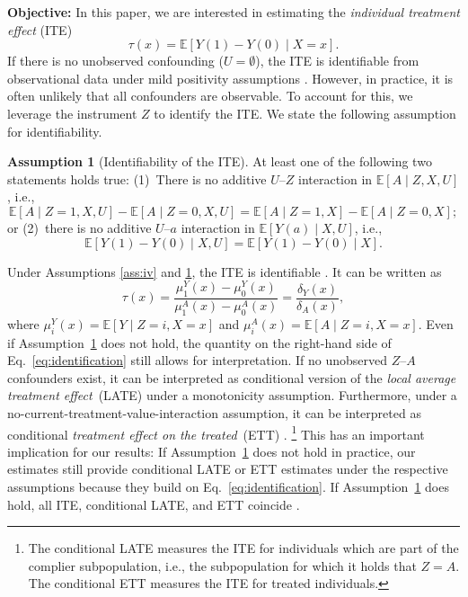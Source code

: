 \documentclass[nonatbib]{article}
\newcommand{\E}{\mathbb{E}}
\theoremstyle{definition}
\newtheorem{assumption}{Assumption}
\theoremstyle{plain}
\begin{document}
\textbf{Objective:} 
In this paper, we are interested in estimating the \emph{individual treatment effect} (ITE)
\begin{equation}
  \tau(x) = \E[Y(1) - Y(0) \mid X = x].
\end{equation}
If there is no unobserved confounding ($U = \emptyset$), the ITE is identifiable from observational data under mild positivity assumptions \cite{Shalit.2017}. However, in practice, it is often unlikely that all confounders are observable. To account for this, we leverage the instrument $Z$ to identify the ITE. We state the following assumption for identifiability.

\begin{assumption}[Identifiability of the ITE]\label{ass:identification}
    At least one of the following two statements holds true: (1)~There is no additive $U$--$Z$ interaction in $\E[A \mid Z, X, U]$, i.e.,
    \begin{equation}
    \E[A \mid Z=1, X, U] - \E[A \mid Z=0, X, U] = \E[A \mid Z=1, X] - \E[A \mid Z=0, X];
    \end{equation}   
    or (2)~there is no additive $U$--$a$ interaction in $\E[Y(a) \mid X, U]$, i.e.,
    \begin{equation}
    \E[Y(1) - Y(0) \mid X, U] = \E[Y(1) - Y(0) \mid X].    
    \end{equation}
\end{assumption}

Under Assumptions \ref{ass:iv} and \ref{ass:identification}, the ITE is identifiable \cite{Wang.2018}. It can be written as
\begin{equation}
\label{eq:identification}
    \tau(x) = \frac{\mu_1^Y(x) - \mu_0^Y(x)}{\mu_1^A(x) - \mu_0^A(x)} = \frac{\delta_Y(x)}{\delta_A(x)},
\end{equation}
where $\mu_i^Y(x) = \E[Y \mid Z = i, X = x]$ and $\mu_i^A(x) = \E[A \mid Z = i, X = x]$. Even if Assumption~\ref{ass:identification} does not hold, the quantity on the right-hand side of Eq.~\eqref{eq:identification} still allows for interpretation. If no unobserved $Z$--$A$ confounders exist, it can be interpreted as conditional version of the \emph{local average treatment effect}~(LATE) \cite{Imbens.1994, BargagliStoffi.2021} under a monotonicity assumption. Furthermore, under a no-current-treatment-value-interaction assumption, it can be interpreted as conditional \emph{treatment effect on the treated}~(ETT) \cite{Wang.2018}. \footnote{The conditional LATE measures the ITE for individuals which are part of the complier subpopulation, i.e., the subpopulation for which it holds that $Z = A$. The conditional ETT measures the ITE for treated individuals.} This has an important implication for our results: If Assumption~\ref{ass:identification} does not hold in practice, our estimates still provide conditional LATE or ETT estimates under the respective assumptions because they build on Eq.~\eqref{eq:identification}. If Assumption~\ref{ass:identification} does hold, all ITE, conditional LATE, and ETT coincide \cite{Wang.2018}.
\end{document}
